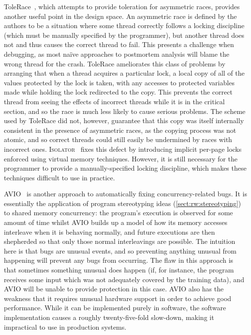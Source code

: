 ToleRace~\cite{Kirovski2007}, which attempts to provide toleration for
asymmetric races, provides another useful point in the design space.
An asymmetric race is defined by the authors to be a situation where
some thread correctly follows a locking discipline (which must be
manually specified by the programmer), but another thread does not and
thus causes the correct thread to fail.  This presents a challenge
when debugging, as most na\"{i}ve approaches to postmortem analysis
will blame the wrong thread for the crash.  ToleRace ameliorates this
class of problems by arranging that when a thread acquires a
particular lock, a local copy of all of the values protected by the
lock is taken, with any accesses to protected variables made while
holding the lock redirected to the copy.  This prevents the correct
thread from seeing the effects of incorrect threads while it is in the
critical section, and so the race is much less likely to cause serious
problems.  The scheme used by ToleRace did not, however, guarantee
that this copy was itself internally consistent in the presence of
asymmetric races, as the copying process was not atomic, and so
correct threads could still easily be undermined by races with
incorrect ones.  \textsc{Isolator}~\cite{Ramalingam2009} fixes this
defect by introducing implicit per-page locks enforced using virtual
memory techniques.  However, it is still necessary for the programmer
to provide a manually-specified locking discipline, which makes these
techniques difficult to use in practice.

AVIO~\cite{Lu} is another approach to automatically fixing
concurrency-related bugs.  It is essentially the application of
program stereotyping ideas (\autoref{sect:rw:stereotyping}) to shared
memory concurrency: the program's execution is observed for some
amount of time whilst AVIO builds up a model of how its memory
accesses interleave when it is behaving normally, and future
executions are then shepherded so that only those normal interleavings
are possible.  The intuition here is that bugs are unusual events, and
so preventing anything unusual from happening will prevent any bugs
from occurring.  The flaw in this approach is that sometimes something
unusual does happen (if, for instance, the program receives some input
which was not adequately covered by the training data), and AVIO will
be unable to provide protection in this case.  AVIO also has the
weakness that it requires unusual hardware support in order to achieve
good performance.  While it can be implemented purely in software, the
software implementation causes a roughly twenty-five-fold slow-down,
making it impractical to use in production systems.

